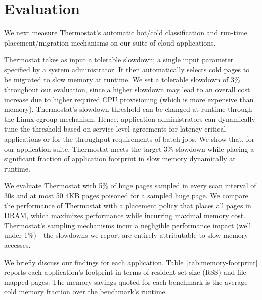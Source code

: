 \section{Evaluation}
\label{results}

We next measure Thermostat's automatic hot/cold classification and run-time
placement/migration mechanisms on our suite of cloud applications.

Thermostat takes as input a tolerable slowdown; a single input parameter 
specified by a system administrator.  It then automatically selects cold pages
 to be migrated to slow memory at runtime. We set a tolerable slowdown of
3\% throughout our evaluation, since a higher slowdown may lead to an overall
cost increase due to higher required CPU provisioning (which is more expensive
than memory). Thermostat's slowdown threshold can be 
changed at runtime through the Linux cgroup mechanism. Hence,
application administrators can
dynamically tune the threshold based on service level agreements
for latency-critical applications or for the throughput requirements of
batch jobs.  We show that, for our application suite, Thermostat meets the
target 3\% slowdown while placing a significant fraction of application footprint in slow memory
dynamically at runtime.


We evaluate Thermostat with 5\% of huge pages sampled in every scan interval of
30s and at most 50 4KB pages poisoned for a sampled huge page.
We compare the performance of Thermostat with a placement policy that
places all pages in DRAM, which maximizes performance while incurring maximal 
memory cost.  Thermostat's sampling mechanisms incur a negligible performance
impact (well under 1\%)---the slowdowns we report are entirely attributable to 
slow memory accesses. 

We briefly discuss our findings for each application. Table~\ref{tab:memory-footprint} reports each 
application's footprint in terms of resident set size (RSS) and file-mapped
pages. The memory savings quoted for each benchmark is the average cold memory
fraction over the benchmark's runtime.

